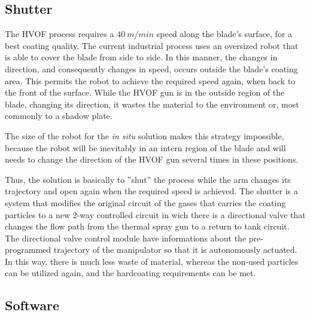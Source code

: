 \subsection{Shutter}

The HVOF process requires a $40~m/min$ speed along the blade's surface, for a
best coating quality. 
The current industrial process uses an oversized robot that is able to
cover the blade from side to side. In this manner, the changes in direction, and
consequently changes in speed, occurs outside the blade's coating area.
This permits the robot to achieve the required speed again, when back to the
front of the surface.
While the HVOF gun is in the outside region of the blade, changing its
direction, it wastes the material to the environment or, most commonly to a
shadow plate.

The size of the robot for the \textit{in situ} solution makes this strategy
impossible, because the robot will be inevitably in an intern region of the blade and will
needs to change the direction of the HVOF gun several times in these
positions. 

Thus, the solution is basically to ''shut'' the process while the arm changes
its trajectory and open again when the required speed is achieved.
The shutter is a system that modifies the original circuit of the gases that
carries the coating particles to a new 2-way controlled circuit in wich there 
is a directional valve that changes the flow path from the thermal spray gun to
a return to tank circuit. 
The directional valve control module have informations about the pre-programmed
trajectory of the manipulator so that it is autonomously actuated.
In this way, there is much less waste of material, whereas the non-used
particles can be utilized again, and the hardcoating requirements can be met.


\subsection{Software}
